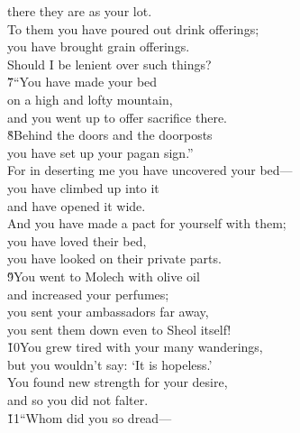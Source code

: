 \begin{poetry}
\poemll    there they are as your lot. \\
\poeml To them you have poured out drink offerings; \\
\poemll    you have brought grain offerings. \\
\poemlll       Should I be lenient over such things? \\
\poeml \v{7}``You have made your bed \\
\poemll    on a high and lofty mountain, \\
\poemlll       and you went up to offer sacrifice there. \\
\poeml \v{8}Behind the doors and the doorposts \\
\poemll    you have set up your pagan sign.'' \\
\poeml For in deserting me you have uncovered your bed--- \\
\poemll    you have climbed up into it \\
\poemlll       and have opened it wide. \\
\poeml And you have made a pact for yourself with them; \\
\poemll    you have loved their bed, \\
\poemlll       you have looked on their private parts. \\
\poeml \v{9}You went to Molech with olive oil \\
\poemll    and increased your perfumes; \\
\poeml you sent your ambassadors far away, \\
\poemll    you sent them down even to Sheol itself! \\
\poeml \v{10}You grew tired with your many wanderings, \\
\poemll    but you wouldn't say: `It is hopeless.' \\
\poeml You found new strength for your desire, \\
\poemll    and so you did not falter. \\
\poeml \v{11}``Whom did you so dread--- \\

\end{poetry}
